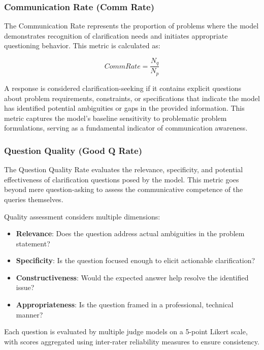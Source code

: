 \documentclass[conference]{IEEEtran}
\begin{document}
\subsubsection{Communication Rate (Comm Rate)}

The Communication Rate represents the proportion of problems where the model demonstrates recognition of clarification needs and initiates appropriate questioning behavior. This metric is calculated as:

\begin{equation}
    \mathit{CommRate} = \frac{N_{q}}{N_{p}}
\end{equation}

A response is considered clarification-seeking if it contains explicit questions about problem requirements, constraints, or specifications that indicate the model has identified potential ambiguities or gaps in the provided information. This metric captures the model's baseline sensitivity to problematic problem formulations, serving as a fundamental indicator of communication awareness.

\subsubsection{Question Quality (Good Q Rate)}

The Question Quality Rate evaluates the relevance, specificity, and potential effectiveness of clarification questions posed by the model. This metric goes beyond mere question-asking to assess the communicative competence of the queries themselves.

Quality assessment considers multiple dimensions:
\begin{itemize}
    \item \textbf{Relevance}: Does the question address actual ambiguities in the problem statement?
    \item \textbf{Specificity}: Is the question focused enough to elicit actionable clarification?
    \item \textbf{Constructiveness}: Would the expected answer help resolve the identified issue?
    \item \textbf{Appropriateness}: Is the question framed in a professional, technical manner?
\end{itemize}

Each question is evaluated by multiple judge models on a 5-point Likert scale, with scores aggregated using inter-rater reliability measures to ensure consistency.
\end{document}
